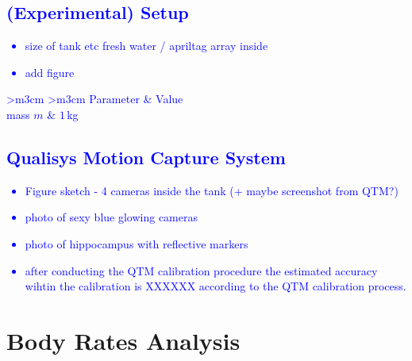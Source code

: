 \textcolor{blue}{
\section{(Experimental) Setup}
\begin{itemize}
    \item size of tank etc fresh water  / apriltag array inside
    \item add figure
\end{itemize}
\begin{table}[]
        \caption{Overview on ....}
		\centering
		\begin{NiceTabular}
            {
            >{\centering\arraybackslash}m{3cm}  %
            >{\centering\arraybackslash}m{3cm} %
            }
            \toprule
            Parameter &  Value \\  
            \midrule 
            mass $m$ & $1$\,kg \\
            \bottomrule
		\end{NiceTabular}
		\label{tab:parameters}
\end{table}
\subsection{Qualisys Motion Capture System}
\begin{itemize}
    \item Figure sketch - 4 cameras inside the tank (+ maybe screenshot from QTM?)
    \item photo of sexy blue glowing cameras
    \item photo of hippocampus with reflective markers
    \item after conducting the QTM calibration procedure the estimated accuracy wihtin the calibration is XXXXXX according to the QTM calibration process.
\end{itemize}
}


\section{Body Rates Analysis}

